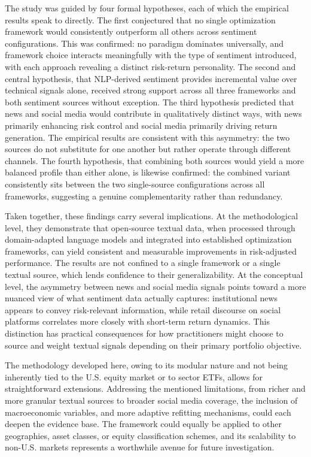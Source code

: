 The study was guided by four formal hypotheses, each of which the empirical results speak to directly. The first conjectured that no single optimization framework would consistently outperform all others across sentiment configurations. This was confirmed: no paradigm dominates universally, and framework choice interacts meaningfully with the type of sentiment introduced, with each approach revealing a distinct risk-return personality. The second and central hypothesis, that NLP-derived sentiment provides incremental value over technical signals alone, received strong support across all three frameworks and both sentiment sources without exception. The third hypothesis predicted that news and social media would contribute in qualitatively distinct ways, with news primarily enhancing risk control and social media primarily driving return generation. The empirical results are consistent with this asymmetry: the two sources do not substitute for one another but rather operate through different channels. The fourth hypothesis, that combining both sources would yield a more balanced profile than either alone, is likewise confirmed: the combined variant consistently sits between the two single-source configurations across all frameworks, suggesting a genuine complementarity rather than redundancy.

Taken together, these findings carry several implications. At the methodological level, they demonstrate that open-source textual data, when processed through domain-adapted language models and integrated into established optimization frameworks, can yield consistent and measurable improvements in risk-adjusted performance. The results are not confined to a single framework or a single textual source, which lends confidence to their generalizability. At the conceptual level, the asymmetry between news and social media signals points toward a more nuanced view of what sentiment data actually captures: institutional news appears to convey risk-relevant information, while retail discourse on social platforms correlates more closely with short-term return dynamics. This distinction has practical consequences for how practitioners might choose to source and weight textual signals depending on their primary portfolio objective.

The methodology developed here, owing to its modular nature and not being inherently tied to the U.S. equity market or to sector ETFs, allows for straightforward extensions. Addressing the mentioned limitations, from richer and more granular textual sources to broader social media coverage, the inclusion of macroeconomic variables, and more adaptive refitting mechanisms, could each deepen the evidence base. The framework could equally be applied to other geographies, asset classes, or equity classification schemes, and its scalability to non-U.S. markets represents a worthwhile avenue for future investigation.

